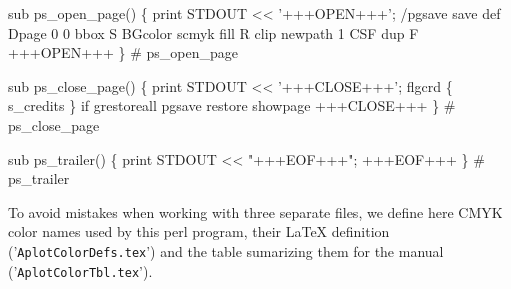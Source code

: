 \documentclass[11pt]{article}
\def\nwendcode{\endtrivlist \endgroup} %
\let\nwdocspar=\par                    %
\begin{document}


\nwenddocs{}\endmoddef
sub ps_open_page() \{
    print STDOUT << '+++OPEN+++';
%
/pgsave save def
Dpage 0 0 bbox S BGcolor scmyk fill R clip newpath
1 CSF dup F
%
+++OPEN+++
\} # ps_open_page
\nwendcode{}\nwdocspar

\nwenddocs{}\endmoddef
sub ps_close_page() \{
    print STDOUT << '+++CLOSE+++';
%
flgcrd \{ s_credits \} if
grestoreall
pgsave restore
showpage
%
%
+++CLOSE+++
\} # ps_close_page
\nwendcode{}\nwdocspar


\nwenddocs{}\endmoddef
sub ps_trailer() \{
    print STDOUT << "+++EOF+++";
%
+++EOF+++
\} # ps_trailer
\nwendcode{}\nwdocspar

\label{sec:CMYKcolordef}

To avoid mistakes when working with three separate files, we define here CMYK color names used by this perl program, their {\LaTeX} definition ('{\tt{}AplotColorDefs.tex}') and the table sumarizing them for the manual ('{\tt{}AplotColorTbl.tex}'). %


\newcommand{\clrtbl}[5]{\vskip -2.5ex \noindent\hrulefill\cln{#1}\cln{#2}\cln{#3}\cln{#4}\cln{#5}}
\newcommand{\clrtblg}[7]{\vskip -2.5ex \noindent\hrulefill\cln{#1}\cln{#2}\cln{#3}\cln{#4}\cln{#5}\cln{#6}\cln{#7}}
\end{document}
